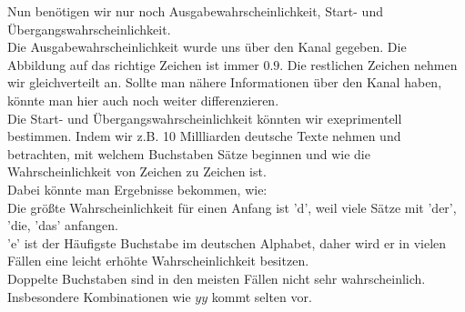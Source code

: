 \documentclass[11pt,a4paper,ngerman]{article}
\begin{document}
\begin{enumerate}[\bfseries (a)]
Nun benötigen wir nur noch Ausgabewahrscheinlichkeit, Start- und Übergangswahrscheinlichkeit.\\

Die Ausgabewahrscheinlichkeit wurde uns über den Kanal gegeben. Die Abbildung auf das richtige Zeichen ist immer $0.9$. Die restlichen Zeichen nehmen wir gleichverteilt an. Sollte man nähere Informationen über den Kanal haben, könnte man hier auch noch weiter differenzieren.\\

Die Start- und Übergangswahrscheinlichkeit könnten wir exeprimentell bestimmen. Indem wir z.B. 10 Millliarden deutsche Texte nehmen und betrachten, mit welchem Buchstaben Sätze beginnen und wie die Wahrscheinlichkeit von Zeichen zu Zeichen ist.\\

Dabei könnte man Ergebnisse bekommen, wie:\\
Die größte Wahrscheinlichkeit für einen Anfang ist 'd', weil viele Sätze mit 'der', 'die, 'das' anfangen.\\
'e' ist der Häufigste Buchstabe im deutschen Alphabet, daher wird er in vielen Fällen eine leicht erhöhte Wahrscheinlichkeit besitzen.\\
Doppelte Buchstaben sind in den meisten Fällen nicht sehr wahrscheinlich. Insbesondere Kombinationen wie $yy$ kommt selten vor.


\end{enumerate}

\label{LastPage}
\end{document}

